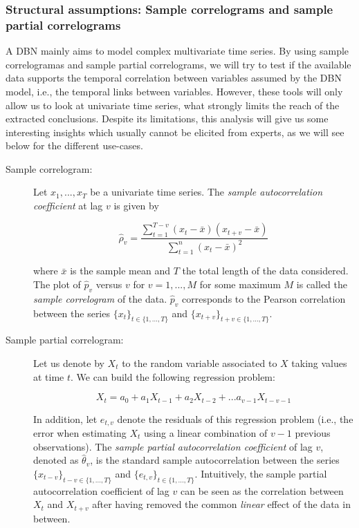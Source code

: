 \subsubsection{Structural assumptions: Sample correlograms and sample partial correlograms}

A DBN mainly aims to model complex multivariate time series. By using sample correlogramas and sample partial correlograms, we will try to test if the available data supports the temporal correlation between variables assumed by the DBN model, i.e., the temporal links between variables. However, these tools will only allow us to look at univariate time series, what strongly limits the reach of the  extracted conclusions. Despite its limitations, this analysis will give us some interesting insights which usually cannot be elicited from experts, as we will see below for the different use-cases.  

\begin{description}
\item[Sample correlogram:] Let ${x_1,...,x_T}$ be a univariate time series. The \emph{sample autocorrelation coefficient} at lag $v$ is given by 

$$ \hat{\rho}_v =\frac{\sum_{t=1}^{T-v} (x_t-\bar{x})(x_{t+v}-\bar{x})}{\sum_{t=1}^{n} (x_t-\bar{x})^2}$$ 

\noindent where $\bar{x}$ is the sample mean and $T$ the total length of the data considered. The plot of $\hat{p}_v$ versus $v$ for $v=1,..., M$ for some maximum $M$ is called the \emph{sample correlogram} of the data. $\hat{p}_v$ corresponds to the Pearson correlation between the series $\{x_t\}_{t\in\{1,...,T\}}$ and $\{x_{t+v}\}_{t+v\in\{1,...,T\}}$.

\item[Sample partial correlogram:] Let us denote by $X_t$ to the random variable associated to $X$ taking values at time $t$. We can build the following regression problem:

$$ X_t = a_0 + a_1X_{t-1} + a_2X_{t-2} + ... a_{v-1}X_{t-v-1}$$

In addition, let $e_{t,v}$ denote the residuals of this regression problem (i.e., the error when estimating $X_t$ using a linear combination of $v-1$ previous observations). The \emph{sample partial autocorrelation coefficient} of lag $v$, denoted as  $\hat{\theta}_v$, is the standard sample autocorrelation between the series $\{x_{t-v}\}_{t-v\in\{1,...,T\}}$ and $\{e_{t,v}\}_{t\in\{1,...,T\}}$. Intuitively, the sample partial autocorrelation coefficient of lag $v$ can be seen as the correlation between $X_t$ and $X_{t+v}$ after having removed the common \emph{linear} effect of the data in between.
\end{description}

